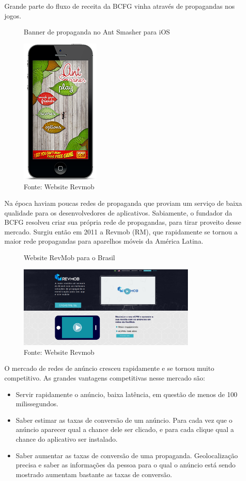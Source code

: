 Grande parte do fluxo de receita da BCFG vinha através de propagandas nos jogos.
\begin{figure}[H]
\caption{Banner de propaganda no Ant Smasher para iOS}
\centerline{\includegraphics[scale=0.5]{img/antsmasheriOS}}
\label{fig:antsmasheriOS}
\caption* {Fonte: Website Revmob}
\end{figure}

Na época haviam poucas redes de propaganda que proviam um serviço de baixa qualidade para os desenvolvedores de aplicativos. Sabiamente, o fundador da BCFG resolveu criar sua própria rede de propagandas, para tirar proveito desse mercado. Surgiu então em 2011 a Revmob (RM), que rapidamente se tornou a maior rede propagandas para aparelhos móveis da América Latina.

\begin{figure}[H]
\caption{Website RevMob para o Brasil}
\centerline{\includegraphics[width=0.8\textwidth]{img/screenshotSiteRev}}
\label{fig:screenshotSiteRev}
\caption* {Fonte: Website Revmob}
\end{figure}

O mercado de redes de anúncio cresceu rapidamente e se tornou muito competitivo. As grandes vantagens competitivas nesse mercado são:
\begin{itemize}
\item Servir rapidamente o anúncio, baixa latência, em questão de menos de 100 milissegundos.
\item Saber estimar as taxas de conversão de um anúncio. Para cada vez que o anúncio aparecer qual a chance dele ser clicado, e para cada clique qual a chance do aplicativo ser instalado.
\item Saber aumentar as taxas de conversão de uma propaganda. Geolocalização precisa e saber as informações da pessoa para o qual o anúncio está sendo mostrado aumentam bastante as taxas de conversão.
\end{itemize}

